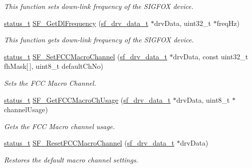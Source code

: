 \begin{DoxyCompactItemize}
\begin{DoxyCompactList}\small\item\em This function sets down-\/link frequency of the S\+I\+G\+F\+OX device. \end{DoxyCompactList}\item 
\mbox{\hyperlink{group__ksdk__common_gaaabdaf7ee58ca7269bd4bf24efcde092}{status\+\_\+t}} \mbox{\hyperlink{group__sf__functions__group_ga63bcdd51a7da55f9e2f204d9d3a56d6b}{S\+F\+\_\+\+Get\+Dl\+Frequency}} (\mbox{\hyperlink{structsf__drv__data__t}{sf\+\_\+drv\+\_\+data\+\_\+t}} $\ast$drv\+Data, uint32\+\_\+t $\ast$freq\+Hz)
\begin{DoxyCompactList}\small\item\em This function gets down-\/link frequency of the S\+I\+G\+F\+OX device. \end{DoxyCompactList}\item 
\mbox{\hyperlink{group__ksdk__common_gaaabdaf7ee58ca7269bd4bf24efcde092}{status\+\_\+t}} \mbox{\hyperlink{group__sf__functions__group_ga94d21504b43b2155491156bff061bf88}{S\+F\+\_\+\+Set\+F\+C\+C\+Macro\+Channel}} (\mbox{\hyperlink{structsf__drv__data__t}{sf\+\_\+drv\+\_\+data\+\_\+t}} $\ast$drv\+Data, const uint32\+\_\+t fh\+Mask\mbox{[}$\,$\mbox{]}, uint8\+\_\+t default\+Ch\+No)
\begin{DoxyCompactList}\small\item\em Sets the F\+CC Macro Channel. \end{DoxyCompactList}\item 
\mbox{\hyperlink{group__ksdk__common_gaaabdaf7ee58ca7269bd4bf24efcde092}{status\+\_\+t}} \mbox{\hyperlink{group__sf__functions__group_ga06e1aa9eda09f899eb5af74991da9bf3}{S\+F\+\_\+\+Get\+F\+C\+C\+Macro\+Ch\+Usage}} (\mbox{\hyperlink{structsf__drv__data__t}{sf\+\_\+drv\+\_\+data\+\_\+t}} $\ast$drv\+Data, uint8\+\_\+t $\ast$channel\+Usage)
\begin{DoxyCompactList}\small\item\em Gets the F\+CC Macro channel usage. \end{DoxyCompactList}\item 
\mbox{\hyperlink{group__ksdk__common_gaaabdaf7ee58ca7269bd4bf24efcde092}{status\+\_\+t}} \mbox{\hyperlink{group__sf__functions__group_ga571dfb5605eba63dd2f275460c26a540}{S\+F\+\_\+\+Reset\+F\+C\+C\+Macro\+Channel}} (\mbox{\hyperlink{structsf__drv__data__t}{sf\+\_\+drv\+\_\+data\+\_\+t}} $\ast$drv\+Data)
\begin{DoxyCompactList}\small\item\em Restores the default macro channel settings. \end{DoxyCompactList}\item 

\end{DoxyCompactItemize}
